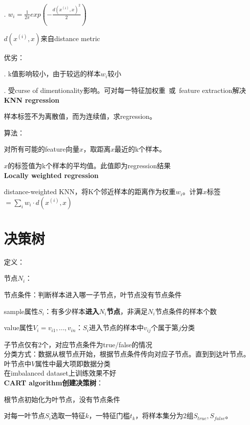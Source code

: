 \documentclass[UTF8]{ctexart}
\begin{document}
  . $w_i = \frac{1}{2\pi} exp(-\frac{d(x^{(i)}, x)^2}{2})$

  \quad $d(x^{(i)}, x)$来自distance metric

  优劣：

  . k值影响较小，由于较远的样本$w_i$较小

  . 受curse of dimentionality影响。可对每一特征加权重\ 或\ feature extraction解决\\
\textbf{KNN regression}

  样本标签不为离散值，而为连续值，求regression。

  算法：

  \quad 对所有可能的feature向量$x$，取距离$x$最近的k个样本。
  
  \quad $x$的标签值为k个样本的平均值。此值即为regression结果\\
\textbf{Locally weighted regression}

  distance-weighted KNN，将K个邻近样本的距离作为权重$w_i$。计算$x$标签$ = \sum_i w_i \cdot d(x^{(i)}, x)$



\section{决策树}
\noindent 定义：

  节点$N_i$：

  \quad 节点条件：判断样本进入哪一子节点，叶节点没有节点条件
  
  \quad sample属性$S_i$：有多少样本\textbf{进入$N_i$节点}，非满足$N_i$节点条件的样本个数

  \quad value属性$V_i = v_{i1}, ..., v_{in}$：$S_i$进入节点的样本中$v_{ij}$个属于第$j$分类
  
  \quad 子节点仅有2个，对应节点条件为true/false的情况\\
分类方式：数据从根节点开始，根据节点条件传向对应子节点。直到到达叶节点。叶节点中$V$属性中最大项即数据分类\\
在imbalanced dataset上训练效果不好\\
\textbf{CART algorithm创建决策树}：

  根节点初始化为叶节点，没有节点条件
  
  对每一叶节点$S_i$选取一特征$k$，一特征门槛$t_k$，将样本集分为2组$S_{true}, S_{false}$。
  
\end{document}
